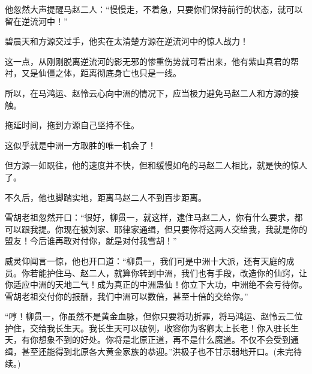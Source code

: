 \begin{this_body}
他忽然大声提醒马赵二人：“慢慢走，不着急，只要你们保持前行的状态，就可以留在逆流河中！”

碧晨天和方源交过手，他实在太清楚方源在逆流河中的惊人战力！

这一点，从刚刚脱离逆流河的影无邪的惨重伤势就可看出来，他有紫山真君的帮衬，又是仙僵之体，距离彻底身亡也只是一线。

所以，在马鸿运、赵怜云心向中洲的情况下，应当极力避免马赵二人和方源的接触。

拖延时间，拖到方源自己坚持不住。

这似乎就是中洲一方取胜的唯一机会了！

但方源一如既往，他的速度并不快，但和缓慢如龟的马赵二人相比，就是快的惊人了。

不久后，他也脚踏实地，距离马赵二人不到百步距离。

雪胡老祖忽然开口：“很好，柳贯一，就这样，逮住马赵二人，你有什么要求，都可以跟我提。你现在被刘家、耶律家通缉，但只要你将这两人交给我，我就是你的盟友！今后谁再敢对付你，就是对付我雪胡！”

威灵仰闻言一惊，他也开口道：“柳贯一，我们可是中洲十大派，还有天庭的成员。你若能护住马、赵二人，就算你转到中洲，我们也有手段，改造你的仙窍，让你适应中洲的天地二气！成为真正的中洲蛊仙！你立下大功，中洲绝不会亏待你。雪胡老祖交付你的报酬，我们中洲可以数倍，甚至十倍的交给你。”

“哼！柳贯一，你虽然不是黄金血脉，但你只要将功折罪，将马鸿运、赵怜云二位护住，交给我长生天。我长生天可以破例，收容你为客卿太上长老！你入驻长生天，有你想象不到的好处。你将是北原正道，再不是什么魔道。不仅不会受到通缉，甚至还能得到北原各大黄金家族的恭迎。”洪极子也不甘示弱地开口。(未完待续。)

\end{this_body}

